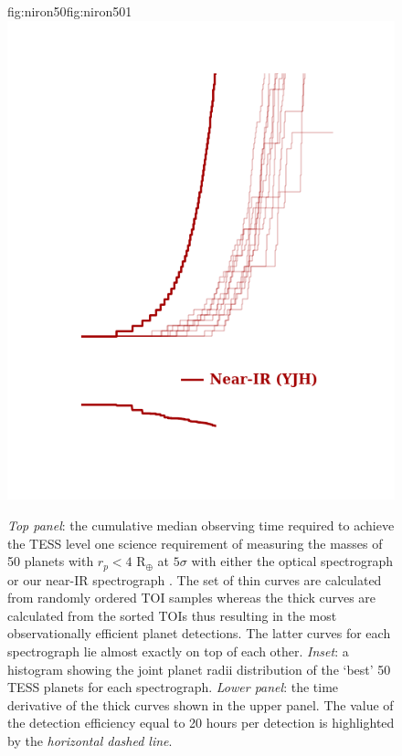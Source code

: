 \begin{figure}
  \begin{ocg}{fig:niron50}{fig:niron50}{1}%
  \includegraphics[width=0.6\hsize]{figures/cumulativetobsGP_50random4_nir.png}%
  \end{ocg}
  \hspace{-0.6\hsize}%
  \caption[Cumulative mean observing time required to complete the TESS level one science requirement.]
          {\small \emph{Top panel}: the cumulative median observing time required to achieve
    the TESS level one science requirement of measuring the masses of 50 planets with
    $r_p <4$ R$_{\oplus}$ at $5\sigma$ with either the optical spectrograph
     or our
    near-IR spectrograph 
    . The set of 
    thin curves are calculated
    from randomly ordered TOI samples whereas the thick curves are calculated from the sorted
    TOIs thus resulting in the most observationally efficient planet detections. The latter curves
    for each spectrograph lie almost exactly on top of each other. \emph{Inset}: a histogram showing the
    joint planet radii distribution of the `best' 50 TESS planets for each spectrograph.
    \emph{Lower panel}: the time derivative of the thick curves shown in the upper panel.
    The value of the detection efficiency equal to 20 hours per detection is highlighted
    by the \emph{horizontal dashed line}.}
  \label{RVFCfig:50}
\end{figure}

